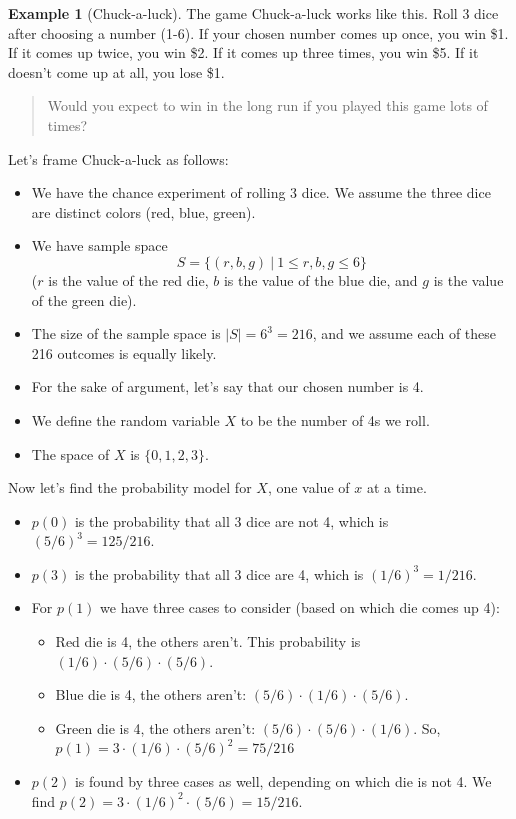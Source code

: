 \documentclass[
]{book}
\providecommand{\tightlist}{%
  \setlength{\itemsep}{0pt}\setlength{\parskip}{0pt}}
\theoremstyle{definition}
\theoremstyle{definition}
\newtheorem{example}{Example}[chapter]
\theoremstyle{definition}
\theoremstyle{definition}
\theoremstyle{remark}
\begin{document}
\begin{example}[Chuck-a-luck]
\protect\hypertarget{exm:chuckaluck}{}\label{exm:chuckaluck}The game Chuck-a-luck works like this. Roll 3 dice after choosing a number (1-6). If your chosen number comes up once, you win \$1. If it comes up twice, you win \$2. If it comes up three times, you win \$5. If it doesn't come up at all, you lose \$1.

\begin{quote}
Would you expect to win in the long run if you played this game lots of times?
\end{quote}

Let's frame Chuck-a-luck as follows:

\begin{itemize}
\tightlist
\item
  We have the chance experiment of rolling 3 dice. We assume the three dice are distinct colors (red, blue, green).
\item
  We have sample space \[S = \{(r,b,g)~|~ 1 \leq r, b, g \leq 6 \}\] (\(r\) is the value of the red die, \(b\) is the value of the blue die, and \(g\) is the value of the green die).
\item
  The size of the sample space is \(|S| = 6^3 = 216\), and we assume each of these 216 outcomes is equally likely.
\item
  For the sake of argument, let's say that our chosen number is 4.
\item
  We define the random variable \(X\) to be the number of 4s we roll.
\item
  The space of \(X\) is \(\{0, 1, 2, 3\}\).
\end{itemize}

Now let's find the probability model for \(X\), one value of \(x\) at a time.

\begin{itemize}
\tightlist
\item
  \(p(0)\) is the probability that all 3 dice are not 4, which is \((5/6)^3 = 125/216.\)
\item
  \(p(3)\) is the probability that all 3 dice are 4, which is \((1/6)^3 = 1/216\).
\item
  For \(p(1)\) we have three cases to consider (based on which die comes up 4):

  \begin{itemize}
  \tightlist
  \item
    Red die is 4, the others aren't. This probability is \((1/6) \cdot (5/6) \cdot (5/6).\)
  \item
    Blue die is 4, the others aren't: \((5/6) \cdot (1/6) \cdot (5/6).\)
  \item
    Green die is 4, the others aren't: \((5/6) \cdot (5/6) \cdot (1/6).\)
    So, \(p(1) = 3 \cdot (1/6)\cdot (5/6)^2 = 75/216\)
  \end{itemize}
\item
  \(p(2)\) is found by three cases as well, depending on which die is not 4. We find \(p(2) = 3 \cdot (1/6)^2\cdot (5/6) = 15/216.\)
\end{itemize}


\end{example}
\end{document}
